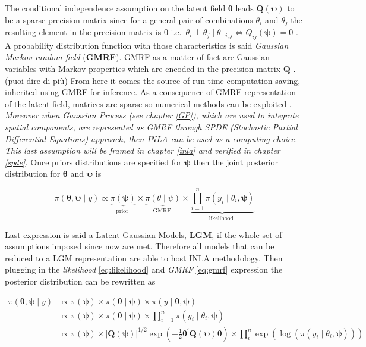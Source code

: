 \documentclass[
  12pt,
  a4paper,
  oneside]{book}
\theoremstyle{definition}
\theoremstyle{definition}
\theoremstyle{definition}
\theoremstyle{remark}
\begin{document}
The conditional independence assumption on the latent field \(\boldsymbol{\theta}\) leads \(\boldsymbol{Q(\psi)}\) to be a sparse precision matrix since for a general pair of combinations \(\theta_{i}\) and \(\theta_{j}\) the resulting element in the precision matrix is 0 i.e.~\(\theta_{i} \perp \theta_{j} \mid \theta_{-i, j} \Longleftrightarrow Q_{i j}(\boldsymbol{\psi})=0\) \citeyearpar{Blangiardo-Cameletti}.
A probability distribution function with those characteristics is said \emph{Gaussian Markov random field} (\textbf{GMRF}). GMRF as a matter of fact are Gaussian variables with Markov properties which are encoded in the precision matrix \(\boldsymbol{Q}\) \citep{Rue2009}. (puoi dire di più)
From here it comes the source of run time computation saving, inherited using GMRF for inference. As a consequence of GMRF representation of the latent field, matrices are sparse so numerical methods can be exploited \citep{Blangiardo-Cameletti}. \emph{Moreover when Gaussian Process (see chapter \ref{GP}), which are used to integrate spatial components, are represented as GMRF through SPDE (Stochastic Partial Differential Equations) approach, then INLA can be used as a computing choice. This last assumption will be framed in chapter \ref{inla} and verified in chapter \ref{spde}.}
Once priors distributions are specified for \(\boldsymbol{\psi}\) then the joint posterior distribution for \(\boldsymbol{\theta}\) and \(\boldsymbol{\psi}\) is

\[
\pi(\boldsymbol{\theta}, \boldsymbol{\psi} \mid y)\propto  \underbrace{\pi(\boldsymbol{\psi})}_{\text {prior }} \times \underbrace{\pi(\theta \mid \psi)}_{\text {GMRF }} \times \underbrace{\prod_{i=1}^{n} \pi\left(y_{i} \mid \theta_{i}, \boldsymbol{\psi}\right)}_{\text {likelihood }}
\]

Last expression is said a Latent Gaussian Models, \textbf{LGM}, if the whole set of assumptions imposed since now are met. Therefore all models that can be reduced to a LGM representation are able to host INLA methodology.
Then plugging in the \emph{likelihood} \eqref{eq:likelihood} and \emph{GMRF} \eqref{eq:gmrf} expression the posterior distribution can be rewritten as

\[
\begin{aligned}
\pi(\boldsymbol{\theta}, \boldsymbol{\psi} \mid y) & \propto \pi(\boldsymbol{\psi}) \times \pi(\boldsymbol{\theta} \mid \boldsymbol{\psi}) \times \pi(y \mid \boldsymbol{\theta}, \boldsymbol{\psi}) \\
& \propto \pi(\boldsymbol{\psi}) \times \pi(\boldsymbol{\theta} \mid \boldsymbol{\psi}) \times \prod_{i=1}^{n} \pi\left(y_{i} \mid \theta_{i}, \boldsymbol{\psi}\right) \\
& \propto \pi(\boldsymbol{\psi}) \times|\boldsymbol{Q}(\boldsymbol{\psi})|^{1 / 2} \exp \left(-\frac{1}{2} \boldsymbol{\theta}^{\prime} \boldsymbol{Q}(\boldsymbol{\psi}) \boldsymbol{\theta}\right) \times \prod_{i}^{n} \exp \left(\log \left(\pi\left(y_{i} \mid \theta_{i}, \boldsymbol{\psi}\right)\right)\right)
\end{aligned}
\]
\end{document}
